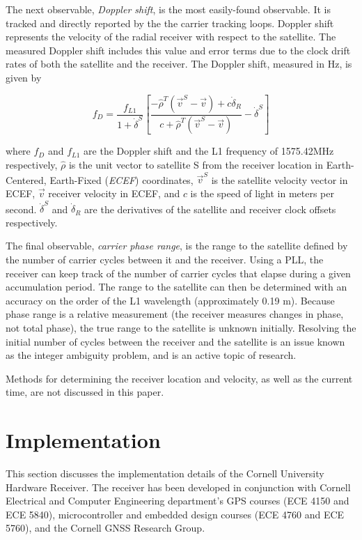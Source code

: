\documentclass[12pt]{article}
\begin{document}
The next observable, \emph{Doppler shift}, is the most easily-found observable. It is tracked and directly reported by the the carrier tracking loops. Doppler shift represents the velocity of the radial receiver with respect to the satellite. The measured Doppler shift includes this value and error terms due to the clock drift rates of both the satellite and the receiver. The Doppler shift, measured in Hz, is given by

\begin{equation}
\label{eqn:doppler}
f_D=\frac{f_{L1}}{1+\dot{\delta}^S}\left[\frac{-\hat{\rho}^T(\vec{v}^S-\vec{v})+c\dot{\delta}_R}{c+\hat{\rho}^T(\vec{v}^S-\vec{v})} - \dot{\delta}^S\right]
\end{equation}

where $f_D$ and $f_{L1}$ are the Doppler shift and the L1 frequency of 1575.42MHz respectively, $\hat{\rho}$ is the unit vector to satellite S from the receiver location in Earth-Centered, Earth-Fixed (\emph{ECEF}) coordinates, $\vec{v}^S$ is the satellite velocity vector in ECEF, $\vec{v}$ receiver velocity in ECEF, and $c$ is the speed of light in meters per second. $\dot{\delta}^S$ and $\dot{\delta}_R$ are the derivatives of the satellite and receiver clock offsets respectively.

The final observable, \emph{carrier phase range}, is the range to the satellite defined by the number of carrier cycles between it and the receiver. Using a PLL, the receiver can keep track of the number of carrier cycles that elapse during a given accumulation period. The range to the satellite can then be determined with an accuracy on the order of the L1 wavelength (approximately 0.19 m). Because phase range is a relative measurement (the receiver measures changes in phase, not total phase), the true range to the satellite is unknown initially. Resolving the initial number of cycles between the receiver and the satellite is an issue known as the integer ambiguity problem, and is an active topic of research.

Methods for determining the receiver location and velocity, as well as the current time, are not discussed in this paper.

\section{Implementation}
This section discusses the implementation details of the Cornell University Hardware Receiver. The receiver has been developed in conjunction with Cornell Electrical and Computer Engineering department's GPS courses (ECE 4150 and ECE 5840), microcontroller and embedded design courses (ECE 4760 and ECE 5760), and the Cornell GNSS Research Group.
\end{document}
